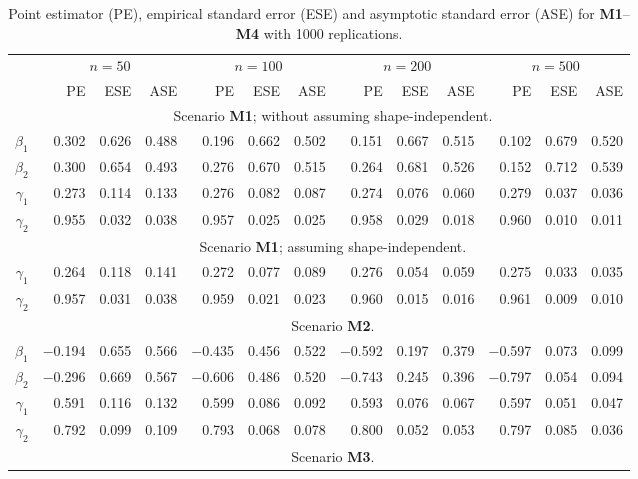 \documentclass[a4paper,10pt]{article}
\begin{document}
\begin{table}[ht]
\centering
\caption{Point estimator (PE), empirical standard error (ESE) and asymptotic standard error (ASE) for \textbf{M1}--\textbf{M4} with 1000 replications.}
\begin{tabular}{r rrr rrr rrr rrr}
\toprule
& \multicolumn{3}{c}{$n=50$} & \multicolumn{3}{c}{$n=100$} & \multicolumn{3}{c}{$n=200$} & \multicolumn{3}{c}{$n=500$}\\
\cmidrule(l){2-4}\cmidrule(l){5-7}\cmidrule(l){8-10}\cmidrule(l){11-13}
& PE & ESE & ASE & PE & ESE & ASE & PE & ESE & ASE & PE & ESE & ASE \\
\midrule
& \multicolumn{12}{c}{Scenario \textbf{M1}; without assuming shape-independent.}\\
[1ex]
$\beta_1$ & 0.302 & 0.626 & 0.488 & 0.196 & 0.662 & 0.502 & 0.151 & 0.667 & 0.515 & 0.102 & 0.679 & 0.520 \\ 
$\beta_2$ & 0.300 & 0.654 & 0.493 & 0.276 & 0.670 & 0.515 & 0.264 & 0.681 & 0.526 & 0.152 & 0.712 & 0.539 \\ 
$\gamma_1$ & 0.273 & 0.114 & 0.133 & 0.276 & 0.082 & 0.087 & 0.274 & 0.076 & 0.060 & 0.279 & 0.037 & 0.036 \\ 
$\gamma_2$ & 0.955 & 0.032 & 0.038 & 0.957 & 0.025 & 0.025 & 0.958 & 0.029 & 0.018 & 0.960 & 0.010 & 0.011 \\ 
[1ex]
& \multicolumn{12}{c}{Scenario \textbf{M1}; assuming shape-independent.}\\
[1ex]
$\gamma_1$ & 0.264 & 0.118 & 0.141 & 0.272 & 0.077 & 0.089 & 0.276 & 0.054 & 0.059 & 0.275 & 0.033 & 0.035 \\ 
$\gamma_2$ & 0.957 & 0.031 & 0.038 & 0.959 & 0.021 & 0.023 & 0.960 & 0.015 & 0.016 & 0.961 & 0.009 & 0.010 \\ 
[1ex]
& \multicolumn{12}{c}{Scenario \textbf{M2}.}\\
[1ex]
$\beta_1$ & $-$0.194 & 0.655 & 0.566 & $-$0.435 & 0.456 & 0.522 & $-$0.592 & 0.197 & 0.379 & $-$0.597 & 0.073 & 0.099 \\ 
$\beta_2$ & $-$0.296 & 0.669 & 0.567 & $-$0.606 & 0.486 & 0.520 & $-$0.743 & 0.245 & 0.396 & $-$0.797 & 0.054 & 0.094 \\ 
$\gamma_1$ & 0.591 & 0.116 & 0.132 & 0.599 & 0.086 & 0.092 & 0.593 & 0.076 & 0.067 & 0.597 & 0.051 & 0.047 \\ 
$\gamma_2$ & 0.792 & 0.099 & 0.109 & 0.793 & 0.068 & 0.078 & 0.800 & 0.052 & 0.053 & 0.797 & 0.085 & 0.036 \\ 
[1ex]
& \multicolumn{12}{c}{Scenario \textbf{M3}.}\\

\end{tabular}
\end{table}
\end{document}
